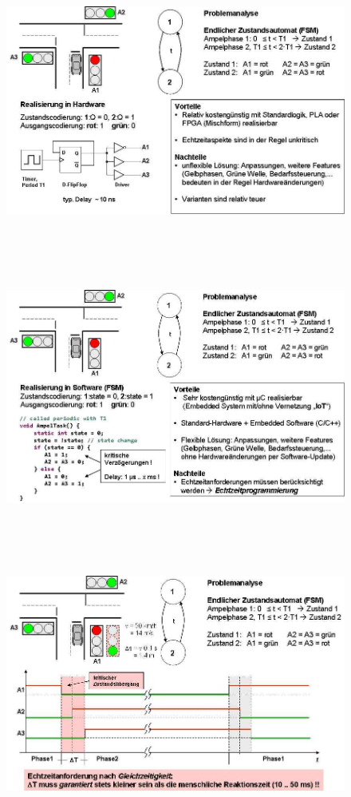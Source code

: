 \begin{figure}[h]
    \centering
    \includegraphics[width=14cm, height=9cm]{Images/image12.png}
    \label{fig:Fig 3}
\end{figure}

\begin{figure}[h]
    \centering
    \includegraphics[width=15cm, height=9cm]{Images/image13.png}
    \label{fig:Fig 3}
\end{figure}

\begin{figure}[h]
    \centering
    \includegraphics[width=15cm, height=9cm]{Images/image14.png}
    \label{fig:Fig 3}
\end{figure}

